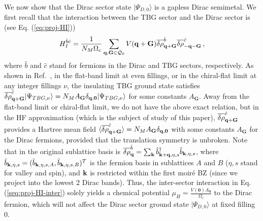 \documentclass[prb,aps,nofootinbib,amssymb,twocolumn,superscriptaddress,10pt]{revtex4-2}
\begin{document}
\begin{widetext}
We now show that the Dirac sector state $|\Psi_{D,0}\rangle$ is a gapless Dirac semimetal. We first recall that the interaction between the TBG sector and the Dirac sector is (see Eq. (\ref{eq:proj-HI}))
\begin{equation}\label{seq:proj-HI-inter}
	H_I^{\hat{b}\hat{c}} = \frac{1}{N_M\Omega_{c}}\sum_{\mathbf{q},\mathbf{G}\in\mathcal{Q}_0}V(\mathbf{q} + \mathbf{G})\overline{\delta\rho}^{\hat{b}}_{\mathbf{q} + \mathbf{G}}\overline{\delta\rho}^{\hat{c}}_{-\mathbf{q} - \mathbf{G}}\,,
\end{equation}
where $\hat{b}$ and $\hat{c}$ stand for fermions in the Dirac and TBG sectors, respectively. As shown in Ref.~\cite{LIA20}, in the flat-band limit at even fillings, or in the chiral-flat limit at any integer fillings $\nu$, the insulating TBG ground state satisfies $\overline{\delta\rho}^{\hat{c}}_{\mathbf{q} + \mathbf{G}}|\Psi_{TBG,\nu}\rangle=N_MA_{\mathbf{G}}\delta_{\mathbf{q},\mathbf{0}}|\Psi_{TBG,\nu}\rangle$ for some constants $A_{\mathbf{G}}$. Away from the flat-band limit or chiral-flat limit, we do not have the above exact relation, but in the HF approximation (which is the subject of study of this paper), $\overline{\delta\rho}^{\hat{c}}_{\mathbf{q} + \mathbf{G}}$ provides a Hartree mean field $\langle \overline{\delta\rho}^{\hat{c}}_{\mathbf{q} + \mathbf{G}}\rangle=N_MA_{\mathbf{G}}\delta_{\mathbf{q},\mathbf{0}}$ with some constants $A_{\mathbf{G}}$ for the Dirac fermions, provided that the translation symmetry is unbroken. Note that in the original sublattice basis is $\overline{\delta\rho}^{\hat{b}}_{\mathbf{q}}=\sum_\mathbf{k}\hat{b}^\dag_{\mathbf{k}+\mathbf{q},\eta,s}\hat{b}_{\mathbf{k},\eta,s}$, where $\hat{b}_{\mathbf{k},\eta,s}=(\hat{b}_{\mathbf{k},\eta,s,A},\hat{b}_{\mathbf{k},\eta,s,B})^T$ is the fermion basis in sublattices $A$ and $B$ ($\eta,s$ stand for valley and spin), and $\mathbf{k}$ is restricted within the first moir\'e BZ (since we project into the lowest 2 Dirac bands). Thus, the inter-sector interaction in Eq. (\ref{seq:proj-HI-inter}) solely yields a chemical potential $\mu_H=\frac{V(\mathbf{0})A_\mathbf{0}}{\Omega_c}$ to the Dirac fermion, which will not affect the Dirac sector ground state $|\Psi_{D,0}\rangle$ at fixed filling $0$. 


\end{widetext}
\end{document}
